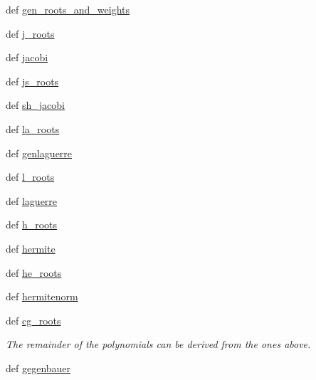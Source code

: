 \begin{DoxyCompactItemize}
\item 
def \hyperlink{namespacescipy_1_1special_1_1orthogonal_a83f5bdfbc38e1bf0b4e32b34d63a7a62}{gen\+\_\+roots\+\_\+and\+\_\+weights}
\item 
def \hyperlink{namespacescipy_1_1special_1_1orthogonal_ae87d8f1c39dea5503136b9978a7cc5b4}{j\+\_\+roots}
\item 
def \hyperlink{namespacescipy_1_1special_1_1orthogonal_a96053fed13b84fd4493726c7004e4325}{jacobi}
\item 
def \hyperlink{namespacescipy_1_1special_1_1orthogonal_a259f3d74b27e4a15e7e0d33210db8b91}{js\+\_\+roots}
\item 
def \hyperlink{namespacescipy_1_1special_1_1orthogonal_a499315ccb0894f64a990a7eda3f2ee48}{sh\+\_\+jacobi}
\item 
def \hyperlink{namespacescipy_1_1special_1_1orthogonal_a5d98adb2bf1c7d4f5eb8a7d42af3abc9}{la\+\_\+roots}
\item 
def \hyperlink{namespacescipy_1_1special_1_1orthogonal_a0b706de2d33b65169c60627fc79d7c99}{genlaguerre}
\item 
def \hyperlink{namespacescipy_1_1special_1_1orthogonal_aa62df640937b5e2b49dea3a4e5055382}{l\+\_\+roots}
\item 
def \hyperlink{namespacescipy_1_1special_1_1orthogonal_a25b6150d2c9e04249be2c7e1e0f0d219}{laguerre}
\item 
def \hyperlink{namespacescipy_1_1special_1_1orthogonal_a94711843be128aff34a3c81a578f3d03}{h\+\_\+roots}
\item 
def \hyperlink{namespacescipy_1_1special_1_1orthogonal_a49106994a6484583ca4aea08c7547bfe}{hermite}
\item 
def \hyperlink{namespacescipy_1_1special_1_1orthogonal_a59be803f0f62398fe80c381bc7323d04}{he\+\_\+roots}
\item 
def \hyperlink{namespacescipy_1_1special_1_1orthogonal_aba2369e6e91fb385ac7623b752d1a1de}{hermitenorm}
\item 
def \hyperlink{namespacescipy_1_1special_1_1orthogonal_ad97402d1597781a438d813cd5141b40a}{cg\+\_\+roots}
\begin{DoxyCompactList}\small\item\em The remainder of the polynomials can be derived from the ones above. \end{DoxyCompactList}\item 
def \hyperlink{namespacescipy_1_1special_1_1orthogonal_a633d987f8e63b04dd089457751572023}{gegenbauer}
\item 

\end{DoxyCompactItemize}

